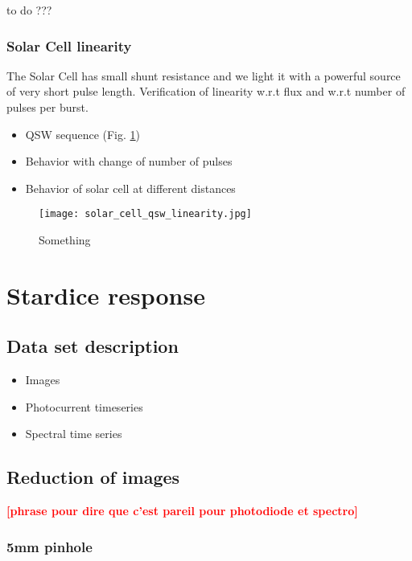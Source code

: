 \documentclass[onecolumn]{aa}
\newcommand{\todo}[1]{\textbf{\textcolor{red}{[#1]}}\xspace}
\begin{document}
to do ???


\subsubsection{Solar Cell linearity}

The Solar Cell has small shunt resistance and we light it with a powerful source
of very short pulse length. Verification of linearity w.r.t flux and w.r.t
number of pulses per burst. 


\begin{itemize}
  \item QSW sequence  (Fig. \ref{fig:SCqswlinearity})
  \item Behavior with change of number of pulses
  \item Behavior of solar cell at different distances
\end{itemize}


\begin{figure}[!ht]
\begin{center}
\texttt{[image: solar\_cell\_qsw\_linearity.jpg]}
\end{center}
\caption[]{Something}
\label{fig:SCqswlinearity}
\end{figure}


\section{Stardice response}
\label{sec:rsd}

\subsection{Data set description}
\label{sec:datadesc}

\begin{itemize}
\item Images
\item Photocurrent timeseries
\item Spectral time series
\end{itemize}

\subsection{Reduction of images}
\label{sec:photometry}

\todo{phrase pour dire que c'est pareil pour photodiode et spectro}

\subsubsection{5mm pinhole}
\end{document}
